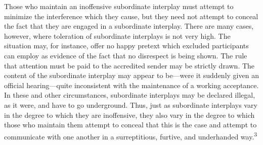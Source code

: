 \documentclass[twoside,symmetric,nobib,justified]{tufte-book}
\begin{document}
Those who maintain an inoffensive subordinate interplay must attempt to
minimize the interference which they cause, but they need not attempt to
conceal the fact that they are engaged in a subordinate interplay. There
are many cases, however, where toleration of subordinate interplays is
not very high. The situation may, for instance, offer no happy pretext
which excluded participants can employ as evidence of the fact that no
disrespect is being shown. The rule that attention must be paid to the
accredited sender may be strictly drawn. The content of the subordinate
interplay may appear to be---were it suddenly given an official
hearing---quite inconsistent with the maintenance of a working
acceptance. In these and other circumstances, subordinate interplays may
be declared illegal, as it were, and have to go underground. Thus, just
as subordinate interplays vary in the degree to which they are
inoffensive, they also vary in the degree to which those who maintain
them attempt to conceal that this is the case and attempt to communicate
with one another in a surreptitious, furtive, and underhanded
way.\textsuperscript{3}
\end{document}
